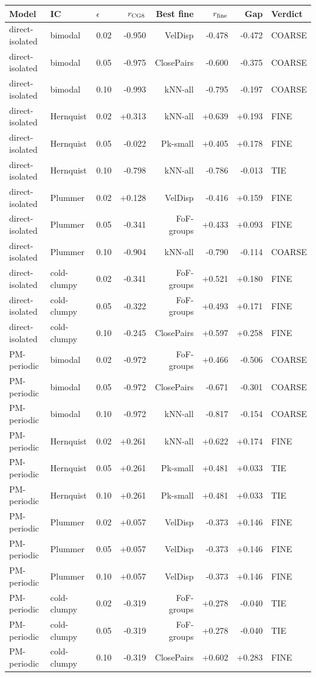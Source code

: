 \begin{tabular}{lllrrrrl}
\toprule
Model & IC & $\epsilon$ & $r_{\rm CG8}$ & Best fine & $r_{\rm fine}$ & Gap & Verdict\\
\midrule
direct-isolated & bimodal & 0.02 & -0.950 & VelDisp & -0.478 & -0.472 & COARSE\\
direct-isolated & bimodal & 0.05 & -0.975 & ClosePairs & -0.600 & -0.375 & COARSE\\
direct-isolated & bimodal & 0.10 & -0.993 & kNN-all & -0.795 & -0.197 & COARSE\\
direct-isolated & Hernquist & 0.02 & +0.313 & kNN-all & +0.639 & +0.193 & FINE\\
direct-isolated & Hernquist & 0.05 & -0.022 & Pk-small & +0.405 & +0.178 & FINE\\
direct-isolated & Hernquist & 0.10 & -0.798 & kNN-all & -0.786 & -0.013 & TIE\\
direct-isolated & Plummer & 0.02 & +0.128 & VelDisp & -0.416 & +0.159 & FINE\\
direct-isolated & Plummer & 0.05 & -0.341 & FoF-groups & +0.433 & +0.093 & FINE\\
direct-isolated & Plummer & 0.10 & -0.904 & kNN-all & -0.790 & -0.114 & COARSE\\
direct-isolated & cold-clumpy & 0.02 & -0.341 & FoF-groups & +0.521 & +0.180 & FINE\\
direct-isolated & cold-clumpy & 0.05 & -0.322 & FoF-groups & +0.493 & +0.171 & FINE\\
direct-isolated & cold-clumpy & 0.10 & -0.245 & ClosePairs & +0.597 & +0.258 & FINE\\
\midrule
PM-periodic & bimodal & 0.02 & -0.972 & FoF-groups & +0.466 & -0.506 & COARSE\\
PM-periodic & bimodal & 0.05 & -0.972 & ClosePairs & -0.671 & -0.301 & COARSE\\
PM-periodic & bimodal & 0.10 & -0.972 & kNN-all & -0.817 & -0.154 & COARSE\\
PM-periodic & Hernquist & 0.02 & +0.261 & kNN-all & +0.622 & +0.174 & FINE\\
PM-periodic & Hernquist & 0.05 & +0.261 & Pk-small & +0.481 & +0.033 & TIE\\
PM-periodic & Hernquist & 0.10 & +0.261 & Pk-small & +0.481 & +0.033 & TIE\\
PM-periodic & Plummer & 0.02 & +0.057 & VelDisp & -0.373 & +0.146 & FINE\\
PM-periodic & Plummer & 0.05 & +0.057 & VelDisp & -0.373 & +0.146 & FINE\\
PM-periodic & Plummer & 0.10 & +0.057 & VelDisp & -0.373 & +0.146 & FINE\\
PM-periodic & cold-clumpy & 0.02 & -0.319 & FoF-groups & +0.278 & -0.040 & TIE\\
PM-periodic & cold-clumpy & 0.05 & -0.319 & FoF-groups & +0.278 & -0.040 & TIE\\
PM-periodic & cold-clumpy & 0.10 & -0.319 & ClosePairs & +0.602 & +0.283 & FINE\\
\midrule
\bottomrule
\end{tabular}
